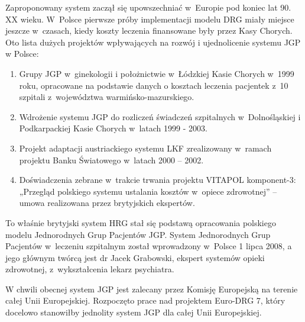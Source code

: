 Zaproponowany system zaczął się upowszechniać w~Europie pod koniec lat 90. XX wieku. W~Polsce pierwsze próby implementacji modelu DRG miały miejsce jeszcze w~czasach, kiedy koszty leczenia finansowane były przez Kasy Chorych. Oto lista dużych projektów wpływających na rozwój i ujednolicenie systemu JGP w Polsce\cite{szkoleniaJGP}:
\begin{enumerate}
\item Grupy JGP w~ginekologii i położnictwie w~Łódzkiej Kasie Chorych w~1999 roku, opracowane na podstawie danych o kosztach leczenia pacjentek z~10 szpitali z~województwa warmińsko-mazurskiego.
\item Wdrożenie systemu JGP do rozliczeń świadczeń szpitalnych w~Dolnośląskiej i Podkarpackiej Kasie Chorych w~latach 1999 - 2003.
\item Projekt adaptacji austriackiego systemu LKF zrealizowany w~ramach projektu Banku Światowego w~latach 2000 – 2002.
\item Doświadczenia zebrane w~trakcie trwania projektu VITAPOL komponent-3: „Przegląd polskiego systemu ustalania kosztów w~opiece zdrowotnej” – umowa realizowana przez brytyjskich ekspertów.
\end{enumerate} 
To właśnie brytyjski system HRG stał się podstawą opracowania polskiego modelu Jednorodnych Grup Pacjentów JGP. System Jednorodnych Grup Pacjentów w~leczeniu szpitalnym został wprowadzony w~Polsce 1 lipca 2008, a jego głównym twórcą jest dr Jacek Grabowski, ekspert systemów opieki zdrowotnej, z~wykształcenia lekarz psychiatra\cite{kozierkiewicz_jgp}.

W chwili obecnej system JGP jest zalecany przez Komisję Europejską na terenie całej Unii Europejskiej. Rozpoczęto prace nad projektem Euro-DRG 7, który docelowo stanowiłby jednolity system JGP dla całej Unii Europejskiej\cite{forumNFZ}.

